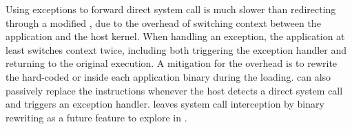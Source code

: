Using exceptions to forward direct system call is much slower than redirecting through a modified \libc{},
due to the overhead of switching context between the application and the host kernel.
When handling an exception,
the application at least switches context twice, including both triggering the exception handler and returning to the original execution.
A mitigation for the overhead
is to rewrite the hard-coded  or  inside each application binary during the loading.
\thelibos{} can also passively replace the instructions
whenever the host detects a direct system call and triggers an exception handler.
\graphene{} leaves system call interception by binary rewriting
as a future feature to explore in \thelibos{}.


